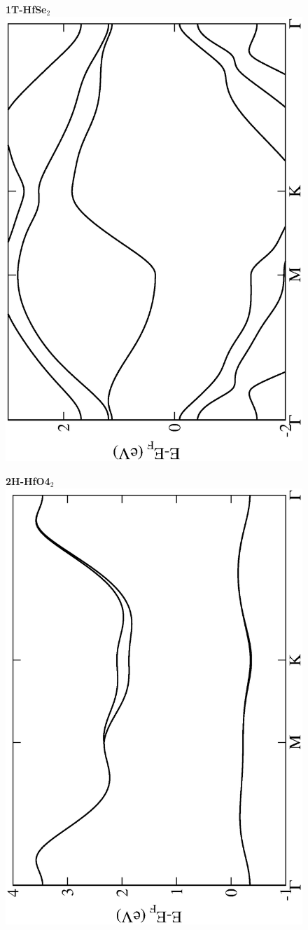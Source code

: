 \begin{figure}[htbp]
\centering
{\bfseries \sffamily 1T-HfSe$_{2}$}\\
\includegraphics[width=0.45\linewidth, angle=-90, trim={2.9cm, 0cm, 2cm, 0cm}, clip]{img/SI_figs/BS/1T-HfSe2.eps}
\end{figure}

\begin{figure}[htbp]
\centering
{\bfseries \sffamily 2H-HfO4$_{2}$}\\
\includegraphics[width=0.45\linewidth, angle=-90, trim={2.9cm, 0cm, 2cm, 0cm}, clip]{img/SI_figs/BS/2H-HfO2.eps}
\end{figure}


